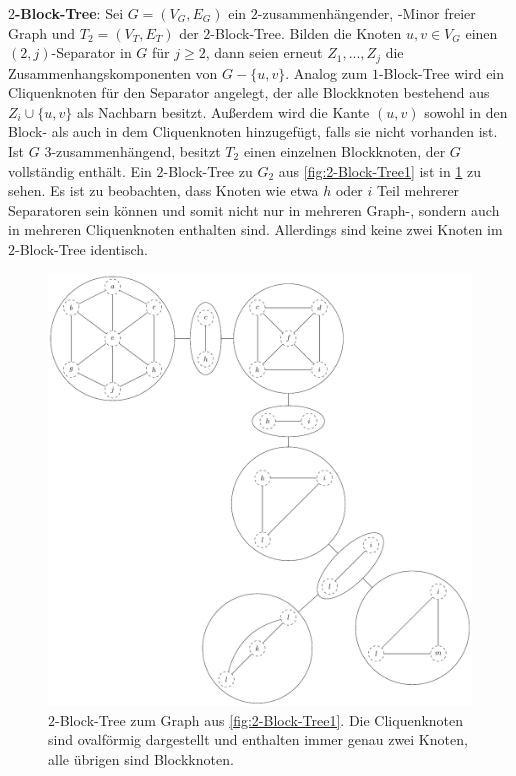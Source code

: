 \textbf{$2$-Block-Tree}: Sei $G = (V_G, E_G)$ ein $2$-zusammenhängender, \kf-Minor freier Graph und $T_2 = (V_T, E_T)$ der $2$-Block-Tree.
Bilden die Knoten $u, v \in V_G$ einen $(2, j)$-Separator in $G$ für $j \geq 2$, dann seien erneut $Z_1, ..., Z_j$ die Zusammenhangskomponenten von $G - \{u, v\}$.
Analog zum $1$-Block-Tree wird ein Cliquenknoten für den Separator angelegt, der alle Blockknoten bestehend aus $Z_i \cup \{u, v\}$ als Nachbarn besitzt.
Außerdem wird die Kante $(u, v)$ sowohl in den Block- als auch in dem Cliquenknoten hinzugefügt, falls sie nicht vorhanden ist.
Ist $G$ $3$-zusammenhängend, besitzt $T_2$ einen einzelnen Blockknoten, der $G$ vollständig enthält.
Ein $2$-Block-Tree zu $G_2$ aus \Abb \ref{fig:2-Block-Tree1} ist in \Abb \ref{fig:2-Block-Tree2} zu sehen.
Es ist zu beobachten, dass Knoten wie etwa $h$ oder $i$ Teil mehrerer Separatoren sein können und somit nicht nur in mehreren Graph-, sondern auch in mehreren Cliquenknoten enthalten sind.
Allerdings sind keine zwei Knoten im $2$-Block-Tree identisch.
\begin{figure}[H]
  \centering
  \includegraphics[width=\textwidth,height=\textheight,keepaspectratio]{bilder/2-Block-Tree2.pdf}
  \caption{$2$-Block-Tree zum Graph aus \Abb \ref{fig:2-Block-Tree1}.
           Die Cliquenknoten sind ovalförmig dargestellt und enthalten immer genau zwei Knoten, alle übrigen sind Blockknoten.}
  \label{fig:2-Block-Tree2}
\end{figure}


